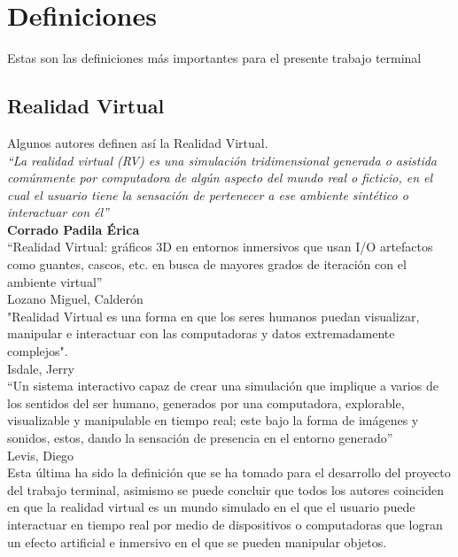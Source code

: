 \documentclass[11pt]{report}
\begin{document}
\section{Definiciones}
Estas son las definiciones más importantes para el presente trabajo terminal

\subsection{Realidad Virtual}
Algunos autores definen así la Realidad Virtual.\\
\newline
\textit{“La realidad virtual (RV) es una simulación tridimensional generada o asistida comúnmente por computadora de algún aspecto del mundo real o ficticio, en el cual el usuario tiene la sensación de pertenecer a ese ambiente sintético o interactuar con él”}\cite{web6}\\ 
\textbf{Corrado Padila Érica}\\
\newline
“Realidad Virtual: gráficos 3D en entornos inmersivos que usan I/O
artefactos como guantes, cascos, etc. en busca de mayores grados de iteración
con el ambiente virtual”\cite{web7}\\ 
Lozano Miguel, Calderón\\
\newline
"Realidad Virtual es una forma en que los seres humanos puedan
visualizar, manipular e interactuar con las computadoras y datos extremadamente
complejos".\cite{web8}\\
Isdale, Jerry\\
\newline
“Un sistema interactivo capaz de crear una simulación que implique a varios de los sentidos del ser humano, generados por una computadora, explorable, visualizable y manipulable en tiempo real; este bajo la forma de imágenes y sonidos, estos, dando la sensación de presencia en el entorno generado”\cite{web9}\\
Levis, Diego\\
\newline
Esta última ha sido la definición que se ha tomado para el desarrollo del proyecto del trabajo terminal, asimismo se puede concluir que todos los autores coinciden en que la realidad virtual es un mundo simulado en el que el usuario puede interactuar en tiempo real por medio
de dispositivos o computadoras que logran un efecto artificial e inmersivo en el que se pueden manipular objetos.
\end{document}
